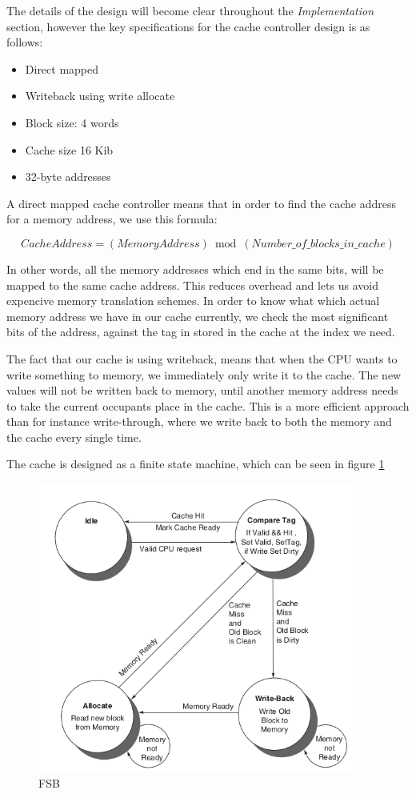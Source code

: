\documentclass{article}
\begin{document}
The details of the design will become clear throughout the \textit{Implementation} section, however the key specifications for the cache controller design is as follows:
\begin{itemize}
  \item{Direct mapped}
  \item{Writeback using write allocate}
  \item{Block size: 4 words}
  \item{Cache size 16 Kib}
  \item{32-byte addresses}
\end{itemize}

A direct mapped cache controller means that in order to find the cache address for a memory address, we use this formula:

\begin{equation}
  CacheAddress = (MemoryAddress) \bmod (Number\_of\_blocks\_in\_cache)
\end{equation}

In other words, all the memory addresses which end in the same bits, will be mapped to the same cache address. This reduces overhead and lets us avoid expencive memory translation schemes. In order to know what which actual memory address we have in our cache currently, we check the most significant bits of the address, against the tag in stored in the cache at the index we need.

The fact that our cache is using writeback, means that when the CPU wants to write something to memory, we immediately only write it to the cache. The new values will not be written back to memory, until another memory address needs to take the current occupants place in the cache. This is a more efficient approach than for instance write-through, where we write back to both the memory and the cache every single time. 

The cache is designed as a finite state machine, which can be seen in figure \ref{FSB}


\begin{figure}[H]
 \centering
  \includegraphics[width=300pt]{img/FSB.png}
  \caption{FSB\cite{BOOK}}
  \label{FSB}
 \end{figure}
\end{document}
